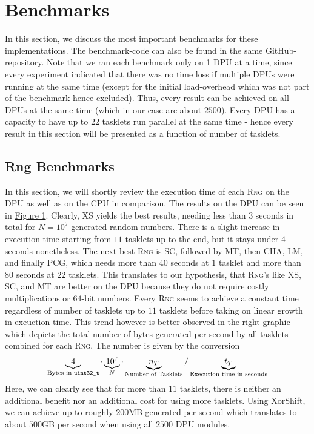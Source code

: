 \documentclass[a4paper]{scrartcl}
\begin{document}
\section{Benchmarks} \label{sec:4}
In this section, we discuss the most important benchmarks for these implementations.
The benchmark-code can also be found in the same GitHub-repository.
Note that we ran each benchmark only on 1 DPU at a time, since every experiment indicated that there was no time loss if multiple DPUs were running at the same time (except for the initial load-overhead which was not part of the benchmark hence excluded).
Thus, every result can be achieved on all DPUs at the same time (which in our case are about $2500$).
Every DPU has a capacity to have up to $22$ tasklets run parallel at the same time - hence every result in this section will be presented as a function of number of tasklets.

\subsection{Rng Benchmarks}
In this section, we will shortly review the execution time of each \textsc{Rng} on the DPU as well as on the CPU in comparison.
The results on the DPU can be seen in \hyperref[fig:1]{Figure 1}.
Clearly, XS yields the best results, needing less than $3$ seconds in total for $N = 10^7$ generated random numbers.
There is a slight increase in execution time starting from $11$ tasklets up to the end, but it stays under $4$ seconds nonetheless.
The next best \textsc{Rng} is SC, followed by MT, then CHA, LM, and finally PCG, which needs more than $40$ seconds at $1$ tasklet and more than $80$ seconds at $22$ tasklets.
This translates to our hypothesis, that \textsc{Rng}'s like XS, SC, and MT are better on the DPU because they do not require costly multiplications or $64$-bit numbers.
Every \textsc{Rng} seems to achieve a constant time regardless of number of tasklets up to $11$ tasklets before taking on linear growth in exeuction time.
This trend however is better observed in the right graphic which depicts the total number of bytes generated per second by all tasklets combined for each \textsc{Rng}.
The number is given by the conversion \[
    \underbrace{4}_{\text{Bytes in \texttt{uint32\_t}}} \cdot \underbrace{10^7}_{N} \cdot \underbrace{n_T}_{\text{Number of Tasklets}} / \underbrace{t_T}_{\text{Execution time in seconds}}
\] 
Here, we can clearly see that for more than $11$ tasklets, there is neither an additional benefit nor an additional cost for using more tasklets.
Using XorShift, we can achieve up to roughly $200$MB generated per second which translates to about $500$GB per second when using all $2500$ DPU modules.
\\
\end{document}
